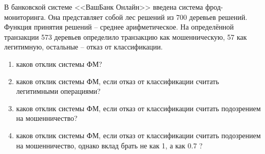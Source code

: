 \documentclass{beamer}
\begin{document}
  \begin{frame}
  В банковской системе <<ВашБанк Онлайн>> введена система фрод-мониторинга. 
  Она представляет собой лес решений из 700 деревьев решений. Функция принятия решений -- среднее арифметическое. На определённой транзакции 573 деревьев определило транзакцию как мошенническую, 57 как легитимную, остальные -- отказ от классификации.
  \begin{enumerate}
     \item каков отклик системы ФМ?
     \item каков отклик системы ФМ, если отказ от классификации считать легитимными операциями?
     \item каков отклик системы ФМ, если отказ от классификации считать подозрением на мошенничество?
     \item каков отклик системы ФМ, если отказ от классификации считать подозрением на мошенничество, однако вклад брать не как 1, а как 0.7 ?
  \end{enumerate}
  
  \end{frame}
  
  
\end{document}
